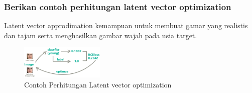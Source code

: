 \subsubsection{Berikan contoh perhitungan latent vector optimization}
\hfill \break
Latent vector approdimation kemampuan untuk membuat gamar yang realistis dan tajam serta menghasilkan gambar wajah pada usia target.
	\begin{figure}[H]
		\includegraphics[width=4cm]{figures/1174066/9/9.png}
		\centering
		\caption{Contoh Perhitungan Latent vector optimization}
	\end{figure}

